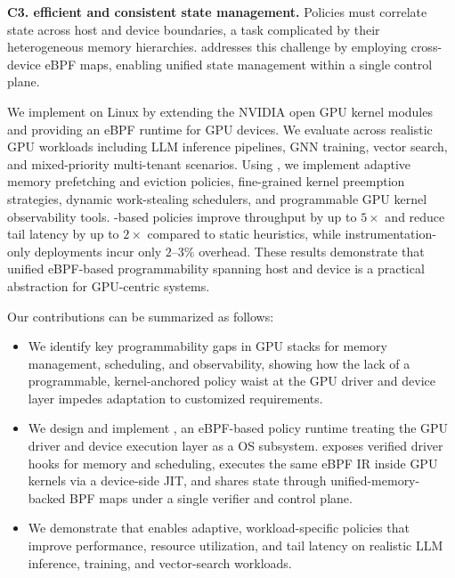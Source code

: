 \textbf{C3. efficient and consistent state management.} Policies must correlate state across host and device boundaries, a task complicated by their heterogeneous memory hierarchies. \sys{} addresses this challenge by employing cross-device eBPF maps, enabling unified state management within a single control plane.


We implement \sys{} on Linux by extending the NVIDIA open GPU kernel modules~\cite{nvidia-open-gpu} and providing an eBPF runtime for GPU devices. We evaluate \sys across realistic GPU workloads including LLM inference pipelines, GNN training, vector search, and mixed-priority multi-tenant scenarios. Using \sys, we implement adaptive memory prefetching and eviction policies, fine-grained kernel preemption strategies, dynamic work-stealing schedulers, and programmable GPU kernel observability tools. \sys-based policies improve throughput by up to $5\times$ and reduce tail latency by up to $2\times$ compared to static heuristics, while instrumentation-only deployments incur only $2$--$3\%$ overhead. These results demonstrate that unified eBPF-based programmability spanning host and device is a practical abstraction for GPU-centric systems.

Our contributions can be summarized as follows:

\begin{itemize}[leftmargin=*,itemsep=0pt]
  \item We identify key programmability gaps in GPU stacks for memory management, scheduling, and observability, showing how the lack of a programmable, kernel-anchored policy waist at the GPU driver and device layer impedes adaptation to customized requirements. %
   
  \item We design and implement \sys, an eBPF-based policy runtime treating the GPU driver and device execution layer as a OS subsystem. \sys exposes verified driver hooks for memory and scheduling, executes the same eBPF IR inside GPU kernels via a device-side JIT, and shares state through unified-memory-backed BPF maps under a single verifier and control plane.
  \item We demonstrate that \sys enables adaptive, workload-specific policies that improve performance, resource utilization, and tail latency on realistic LLM inference, training, and vector-search workloads.
\end{itemize}
